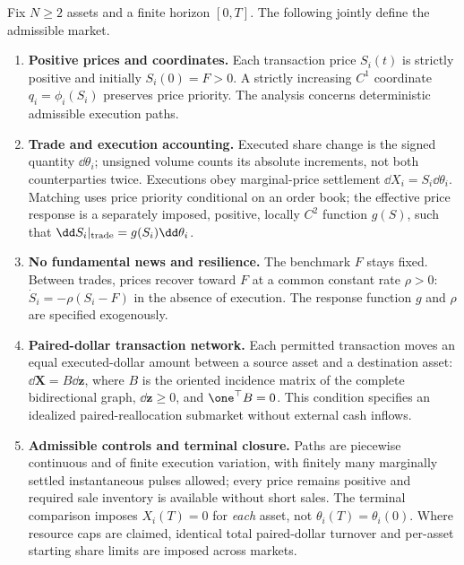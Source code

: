\documentclass[review,hidelinks,onefignum,onetabnum]{siamonline250211}
\begin{document}
\begin{assumption}\label{asmp:model}
Fix $N\ge2$ assets and a finite horizon $[0,T]$. The following jointly define the admissible market.
\begin{enumerate}[label=\textup{(M\arabic*)},leftmargin=2.9em,itemsep=0.20em]
\item \textbf{Positive prices and coordinates.} Each transaction price $S_i(t)$ is strictly positive and initially $S_i(0)=F>0$. A strictly increasing $C^1$ coordinate $q_i=\phi_i(S_i)$ preserves price priority. The analysis concerns deterministic admissible execution paths.
\item \textbf{Trade and execution accounting.} Executed share change is the signed quantity $\dd\theta_i$; unsigned volume counts its absolute increments, not both counterparties twice. Executions obey marginal-price settlement $\dd X_i=S_i\dd\theta_i$. Matching uses price priority conditional on an order book; the effective price response is a separately imposed, positive, locally $C^2$ function $g(S)$, such that $\dd S_i|_{\rm trade}=g(S_i)\dd\theta_i$.
\item \textbf{No fundamental news and resilience.} The benchmark $F$ stays fixed. Between trades, prices recover toward $F$ at a common constant rate $\rho>0$: $\dot S_i=-\rho(S_i-F)$ in the absence of execution. The response function $g$ and $\rho$ are specified exogenously.
\item \textbf{Paired-dollar transaction network.} Each permitted transaction moves an equal executed-dollar amount between a source asset and a destination asset: $\dd\bm X=B\dd\bm z$, where $B$ is the oriented incidence matrix of the complete bidirectional graph, $\dd\bm z\ge0$, and $\one^\top B=0$. This condition specifies an idealized paired-reallocation submarket without external cash inflows.
\item \textbf{Admissible controls and terminal closure.} Paths are piecewise continuous and of finite execution variation, with finitely many marginally settled instantaneous pulses allowed; every price remains positive and required sale inventory is available without short sales. The terminal comparison imposes $X_i(T)=0$ for \emph{each} asset, not $\theta_i(T)=\theta_i(0)$. Where resource caps are claimed, identical total paired-dollar turnover and per-asset starting share limits are imposed across markets.
\end{enumerate}
\end{assumption}
\end{document}
